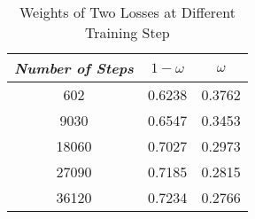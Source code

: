 \begin{table}[t]
    \vspace{-0cm}
    \caption{Weights of Two Losses at Different Training Step}
    \vspace{-0cm}
    \begin{center}
    \begin{tabular}{|c|c|c|}
    \hline
    \textbf{\textit{Number of Steps}} & \textbf{\textit{$1 - \omega$}} & \textbf{\textit{$\omega$}}\\
    \hline
    602 &0.6238 & 0.3762  \\
    9030 &0.6547 & 0.3453  \\
    18060 &0.7027 & 0.2973  \\
    27090 &0.7185 & 0.2815  \\
    36120 &0.7234 & 0.2766  \\

    \hline
    \end{tabular}
    \vspace{-0cm}
    \label{weights}
    \end{center}
    \vspace{-0cm}
    \end{table}